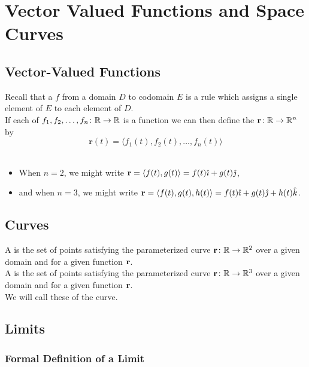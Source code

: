 \section{Vector Valued Functions and Space Curves}

\subsection{Vector-Valued Functions}

Recall that a  \(f\) from a domain \(D\) to codomain \(E\) is a rule which assigns a single element of \(E\) to each element of \(D\). \\

If each of \(f_{1},f_{2},\ldots,f_{n} \colon \mathbb{R} \to \mathbb{R}\) is a function we can then define the  \(\mathbf{r} \colon \mathbb{R} \to \mathbb{R}^{n}\) by
\[
    \mathbf{r}(t) = \langle f_{1}(t),f_{2}(t),\ldots,f_{n}(t) \rangle
\]\
\begin{itemize}
    \item When \(n = 2\), we might write \(\mathbf{r} = \left\langle f(t),g(t) \right\rangle = f(t)\hat{\imath} + g(t)\hat{\jmath}\),
    \item and when \(n = 3\), we might write \(\mathbf{r} = \left\langle f(t),g(t),h(t) \right\rangle = f(t)\hat{\imath} + g(t)\hat{\jmath} + h(t)\hat{k}\).
\end{itemize}

\subsection{Curves}

A  is the set of points satisfying the parameterized curve \(\mathbf{r} \colon \mathbb{R} \to \mathbb{R}^{2}\) over a given domain and for a given function \(\mathbf{r}\). \\

A  is the set of points satisfying the parameterized curve \(\mathbf{r} \colon \mathbb{R} \to \mathbb{R}^{3}\) over a given domain and for a given function \(\mathbf{r}\). \\

We will call these  of the curve.

\subsection{Limits}

\subsubsection{Formal Definition of a Limit}

